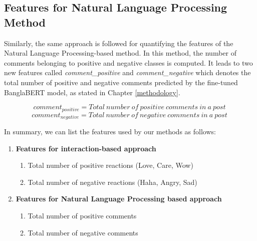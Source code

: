 \subsection{Features for Natural Language Processing Method}
Similarly, the same approach is followed for quantifying the features of the Natural Language Processing-based method. In this method, the number of comments belonging to positive and negative classes is computed. It leads to two new features called \textit{comment\_positive} and \textit{comment\_negative} which denotes the total number of positive and negative comments predicted by the fine-tuned BanglaBERT model, as stated in Chapter \ref{methodology}.

$$  comment_{positive} = Total\ number\ of\ positive\ comments\ in\ a\ post\ $$
$$  comment_{negative} = Total\ number\ of\ negative\ comments\ in\ a\ post\ $$

In summary, we can list the features used by our methods as follows:

\begin{enumerate}
    \item {
        \textbf{Features for interaction-based approach}
        \begin{enumerate}
            \item {Total number of positive reactions (Love, Care, Wow)}
            \item {Total number of negative reactions (Haha, Angry, Sad)}
        \end{enumerate}
    }
    \item {
        \textbf{Features for Natural Language Processing based approach}
        \begin{enumerate}
            \item {Total number of positive comments}
            \item {Total number of negative comments}
        \end{enumerate}
    }
    
\end{enumerate}